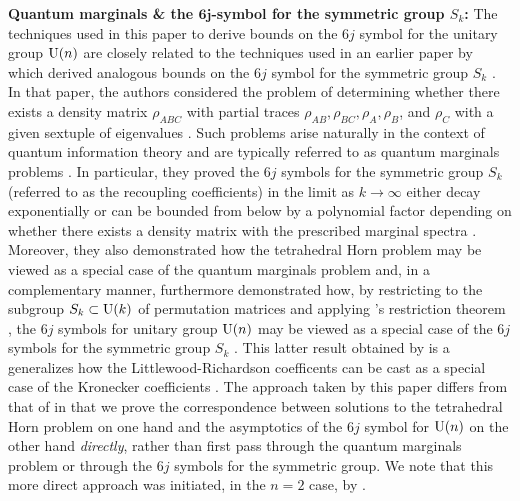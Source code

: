 \documentclass[notitlepage, 10pt]{article}
\begin{document}
\vspace{1em}
\textbf{Quantum marginals \& the $\boldsymbol{6j}$-symbol for the symmetric group $S_k$:}
The techniques used in this paper to derive bounds on the $6j$ symbol for the unitary group $\operatorname{U}(n)$ are closely related to the techniques used in an earlier paper by \citeauthor{christandl2018recoupling} which derived analogous bounds on the $6j$ symbol for the symmetric group $S_k$ \cite{christandl2018recoupling}.
In that paper, the authors considered the problem of determining whether there exists a density matrix $\rho_{ABC}$ with partial traces $\rho_{AB}, \rho_{BC}, \rho_{A}, \rho_{B}$, and $\rho_{C}$ with a given sextuple of eigenvalues \cite{christandl2018recoupling}.
Such problems arise naturally in the context of quantum information theory and are typically referred to as quantum marginals problems \cite{christandl2018recoupling,fraser2022sufficient}.
In particular, they proved the $6j$ symbols for the symmetric group $S_k$ (referred to as the recoupling coefficients) in the limit as $k \to \infty$ either decay exponentially or can be bounded from below by a polynomial factor depending on whether there exists a density matrix with the prescribed marginal spectra \cite{christandl2018recoupling}.
Moreover, they also demonstrated how the tetrahedral Horn problem may be viewed as a special case of the quantum marginals problem and, in a complementary manner, furthermore demonstrated how, by restricting to the subgroup $S_k \subset \operatorname{U}(k)$ of permutation matrices and applying \citeauthor{nishiyama2000restriction}'s restriction theorem \cite{nishiyama2000restriction}, the $6j$ symbols for unitary group $\operatorname{U}(n)$ may be viewed as a special case of the $6j$ symbols for the symmetric group $S_k$ \cite{christandl2018recoupling}.
This latter result obtained by \cite{christandl2018recoupling} is a generalizes how the Littlewood-Richardson coefficents can be cast as a special case of the Kronecker coefficients \cite{littlewood1958products,murnaghan1955analysis,ikenmeyer2023all}.
The approach taken by this paper differs from that of \cite{christandl2018recoupling} in that we prove the correspondence between solutions to the tetrahedral Horn problem on one hand and the asymptotics of the $6j$ symbol for $\operatorname{U}(n)$ on the other hand \textit{directly}, rather than first pass through the quantum marginals problem or through the $6j$ symbols for the symmetric group.
We note that this more direct approach was initiated, in the $n=2$ case, by \citeauthor{backens2010sixjsymbols} \cite{backens2010sixjsymbols}.
\end{document}

